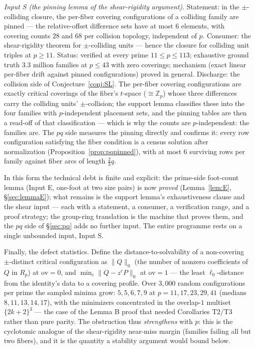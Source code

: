 \documentclass[11pt,a4paper]{article}
\numberwithin{equation}{section}
\theoremstyle{plain}
\theoremstyle{definition}
\theoremstyle{remark}
\newcommand{\Z}{\mathbb{Z}}
\begin{document}
\emph{Input S (the pinning lemma of the shear-rigidity argument).}
Statement: in the $\pm$-colliding closure, the per-fiber covering
configurations of a colliding family are pinned --- the relative-offset
difference sets have at most $6$ elements, with covering counts $28$ and
$68$ per collision topology, independent of $p$. Consumer: the
shear-rigidity theorem for $\pm$-colliding units --- hence the closure for
colliding unit triples at $p\ge11$. Status: verified at every prime
$11\le p\le113$; exhaustive ground truth $3.3$ million families at $p\le43$
with zero coverings; mechanism (exact linear per-fiber drift against
pinned configurations) proved in general. Discharge: the collision side of
Conjecture~\ref{conj:SL}. The per-fiber covering configurations are exactly
critical coverings of the fiber's $t$-space ($\cong\Z_p$) whose three
differences carry the colliding units' $\pm$-collision; the support lemma
classifies these into the four families with $p$-independent placement
sets, and the pinning tables are then a read-off of that classification ---
which is why the counts are $p$-independent: the families are. The $pq$
side measures the pinning directly and confirms it: every row configuration
satisfying the fiber condition is a census solution after normalization
(Proposition~\ref{prop:pqpinned}), with at most $6$ surviving rows per
family against fiber arcs of length $\tfrac23 q$.

In this form the technical debt is finite and explicit: the prime-side
foot-count lemma (Input E, one-foot at two size pairs) is now \emph{proved}
(Lemma~\ref{lem:E}, \S\ref{sec:lemmaE}); what remains is the support
lemma's exhaustiveness clause and the shear input --- each with a
statement, a consumer, a verification range, and a proof strategy; the
group-ring translation is the machine that proves them, and the $pq$ side
of \S\ref{sec:pq} adds no further input. The entire
programme rests on a single unbounded input, Input S.

\medskip
Finally, the defect statistics. Define the distance-to-solvability of a
non-covering $\pm$-distinct critical configuration as $\|Q\|_{0}$ (the
number of nonzero coefficients of $Q$ in $R_p$) at $\mathrm{ov}=0$, and
$\min_e\|Q-z^eP\|_{0}$ at $\mathrm{ov}=1$ --- the least $\ell_0$-distance
from the identity's data to a covering profile. Over $3{,}000$ random
configurations per prime the sampled minima grow: $5,5,6,7,9$ at
$p=11,17,23,29,41$ (medians $8,11,13,14,17$), with the minimizers
concentrated in the overlap-$1$ multiset $\{2k{+}2\}^3$ --- the case of the
Lemma B proof that needed Corollaries T2/T3 rather than pure parity. The
obstruction thus \emph{strengthens} with $p$: this is the cyclotomic
analogue of the shear-rigidity near-miss margin (families failing all but
two fibers), and it is the quantity a stability argument would bound below.
\end{document}

